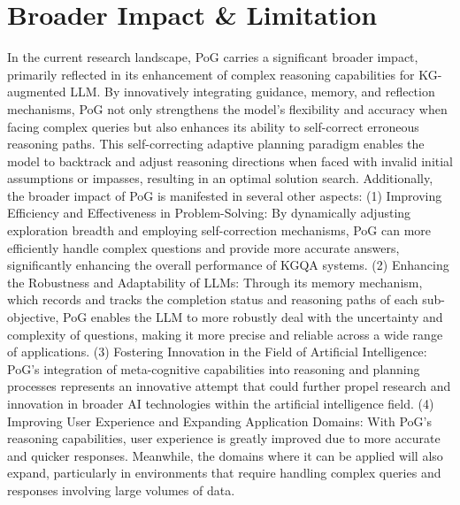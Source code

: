 \documentclass{article}
\begin{document}
\section{Broader Impact \& Limitation}
\label{apdx:lim}
In the current research landscape, PoG carries a significant broader impact, primarily reflected in its enhancement of complex reasoning capabilities for KG-augmented LLM. By innovatively integrating guidance, memory, and reflection mechanisms, PoG not only strengthens the model's flexibility and accuracy when facing complex queries but also enhances its ability to self-correct erroneous reasoning paths. This self-correcting adaptive planning paradigm enables the model to backtrack and adjust reasoning directions when faced with invalid initial assumptions or impasses, resulting in an optimal solution search. Additionally, the broader impact of PoG is manifested in several other aspects: (1) Improving Efficiency and Effectiveness in Problem-Solving: By dynamically adjusting exploration breadth and employing self-correction mechanisms, PoG can more efficiently handle complex questions and provide more accurate answers, significantly enhancing the overall performance of KGQA systems.
(2) Enhancing the Robustness and Adaptability of LLMs: Through its memory mechanism, which records and tracks the completion status and reasoning paths of each sub-objective, PoG enables the LLM to more robustly deal with the uncertainty and complexity of questions, making it more precise and reliable across a wide range of applications.
(3) Fostering Innovation in the Field of Artificial Intelligence: PoG's integration of meta-cognitive capabilities into reasoning and planning processes represents an innovative attempt that could further propel research and innovation in broader AI technologies within the artificial intelligence field.
(4) Improving User Experience and Expanding Application Domains: With PoG's reasoning capabilities, user experience is greatly improved due to more accurate and quicker responses. Meanwhile, the domains where it can be applied will also expand, particularly in environments that require handling complex queries and responses involving large volumes of data.
\end{document}
